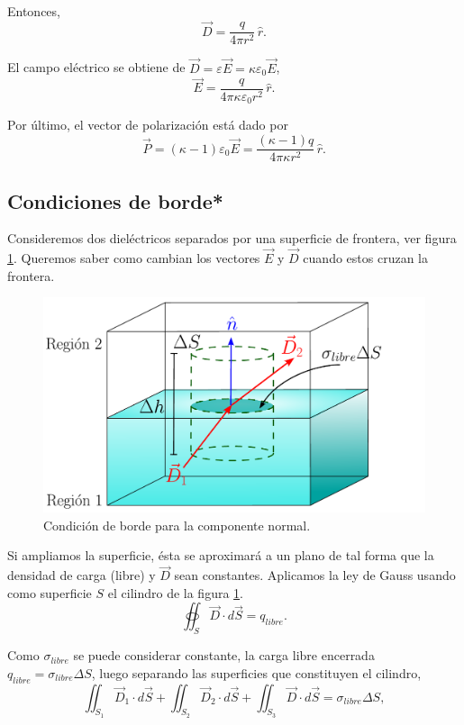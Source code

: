 \begin{ejemplo}
    Entonces,
    $$\Vec{D} = \frac{q}{4\pi r^2} \,\hat{r}.$$

    El campo eléctrico se obtiene de $\Vec{D} = \varepsilon \Vec{E} = \kappa \varepsilon_0 \Vec{E}$,
    $$\Vec{E} = \frac{q}{4\pi \kappa \varepsilon_0 r^2} \,\hat{r}.$$

    Por último, el vector de polarización está dado por
    $$\Vec{P} = (\kappa -1) \varepsilon_0 \Vec{E} = \frac{(\kappa-1)q}{4\pi \kappa r^2} \,\hat{r}.$$
\end{ejemplo}

\subsection{Condiciones de borde*} \label{sec:Cond-Borde-Dielectricos}

Consideremos dos dieléctricos separados por una superficie de frontera, ver figura \ref{fig:Borde-Normal}. Queremos saber como cambian los vectores $\Vec{E}$ y $\Vec{D}$ cuando estos cruzan la frontera. 

\begin{figure}[H]
    \centering
    \includegraphics[scale = 0.6]{Figuras/Condicion-Borde-Normal.pdf}
    \caption{Condición de borde para la componente normal.}
    \label{fig:Borde-Normal}
\end{figure}

Si ampliamos la superficie, ésta se aproximará a un plano de tal forma que la densidad de carga (libre) y $\Vec{D}$ sean constantes. Aplicamos la ley de Gauss usando como superficie $S$ el cilindro de la figura \ref{fig:Borde-Normal}. 
$$\oiint_S \Vec{D} \cdot d\Vec{S} = q_{libre}.$$

Como $\sigma_{libre}$ se puede considerar constante, la carga libre encerrada $q_{libre} = \sigma_{libre} \Delta S$, luego separando las superficies que constituyen el cilindro,
\begin{equation}
\iint_{S_1} \Vec{D}_1 \cdot d\Vec{S} + \iint_{S_2} \Vec{D}_2 \cdot d\Vec{S} + \iint_{S_3} \Vec{D} \cdot d\Vec{S} = \sigma_{libre} \Delta S,    \label{Borden-Normal}
\end{equation}

